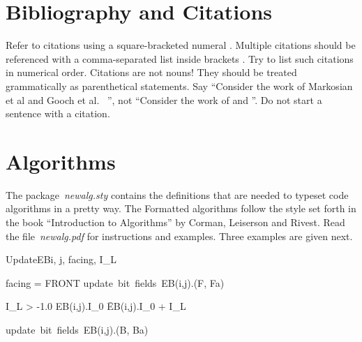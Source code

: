 \documentclass[accepted,single]{gipaper}
\begin{document}

\section{Bibliography and Citations}
\label{bibcit}

Refer to citations using a square-bracketed numeral
\cite{Sousa_etal_CGF:2003}. Multiple citations should be
referenced with a comma-separated list inside brackets
\cite{Gauss:1827,Gray:1997,Shary:2002}.   Try to list such
citations in numerical order.  Citations are not nouns! They
should be treated grammatically as parenthetical statements. Say
``Consider the work of Markosian et al \cite{Markosian:1997} and
Gooch et al.~\cite{Gooch_etal_TOG:2004} '', not ``Consider the
work of \cite{Markosian:1997} and \cite{Gooch_etal_TOG:2004}''. Do
not start a sentence with a citation.


\section{Algorithms}
\label{algorithms}

The package~\emph{newalg.sty} contains the definitions that are
needed to typeset code algorithms in a pretty way.  The Formatted
algorithms follow the style set forth in the book ``Introduction
to Algorithms'' by Corman, Leiserson and Rivest. Read the
file~\emph{newalg.pdf} for instructions and examples. Three
examples are given next.

\vspace{0.4cm}


\begin{algorithm}{UpdateEB}{i, j, facing, I_{L}}
\begin{IF}{facing = FRONT}
update~bit~fields~EB(i,j).(F, Fa) \\
\begin{IF}{I_{L} > -1.0}
EB(i,j).I_{0} \= EB(i,j).I_{0} + I_{L}
\end{IF}
\ELSE update~bit~fields~EB(i,j).(B, Ba)
\end{IF}
\end{algorithm}
\end{document}
